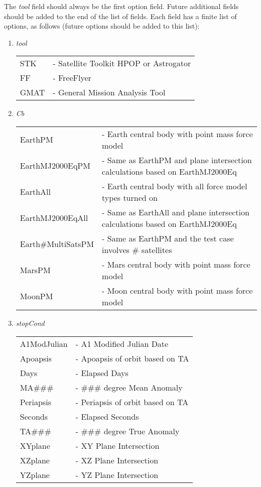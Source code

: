 The \emph{tool} field should always be the first option field.
Future additional fields should be added to the end of the list of
fields. Each field has a finite list of options, as follows (future
options should be added to this list):
\begin{enumerate}
  \item \emph{tool}
  \begin{tabular}{ll}
    STK  & - Satellite Toolkit HPOP or Astrogator\\
    FF   & - FreeFlyer\\
    GMAT & - General Mission Analysis Tool\\
  \end{tabular}

  \item \emph{Cb}
  \begin{tabular}{ll}
    EarthPM & - Earth central body with point mass force model\\
    EarthMJ2000EqPM & - Same as EarthPM and plane intersection calculations based on EarthMJ2000Eq\\
    EarthAll & - Earth central body with all force model types turned on\\
    EarthMJ2000EqAll & - Same as EarthAll and plane intersection calculations based on EarthMJ2000Eq\\
    Earth\#MultiSatsPM & - Same as EarthPM and the test case involves \# satellites \\
    MarsPM & - Mars central body with point mass force model\\
    MoonPM & - Moon central body with point mass force model\\
  \end{tabular}

  \item \emph{stopCond}
  \begin{tabular}{ll}
    A1ModJulian & - A1 Modified Julian Date\\
    Apoapsis & - Apoapsis of orbit based on TA\\
    Days & - Elapsed Days\\
    MA\#\#\# & - \#\#\# degree Mean Anomaly\\
    Periapsis  & - Periapsis of orbit based on TA\\
    Seconds  & - Elapsed Seconds\\
    TA\#\#\# & - \#\#\# degree True Anomaly\\
    XYplane & - XY Plane Intersection\\
    XZplane & - XZ Plane Intersection\\
    YZplane & - YZ Plane Intersection\\
  \end{tabular}
\end{enumerate}
